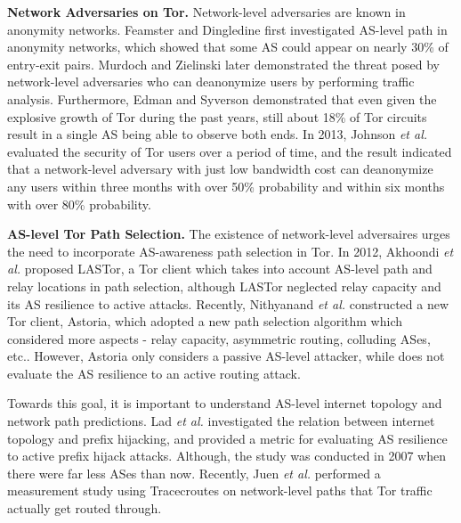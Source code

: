 {\bf Network Adversaries on Tor.}
Network-level adversaries are known in anonymity networks. Feamster and Dingledine \cite{feamster2004location} first investigated AS-level path in anonymity networks, which showed that some AS could appear on nearly 30\% of entry-exit pairs. Murdoch and Zielinski \cite{murdoch2007sampled} later demonstrated the threat posed by network-level adversaries who can deanonymize users by performing traffic analysis. Furthermore, Edman and Syverson \cite{edman2009awareness} demonstrated that even given the explosive growth of Tor during the past years, still about 18\% of Tor circuits result in a single AS being able to observe both ends. In 2013, Johnson \emph{et al.} \cite{johnson2013users} evaluated the security of Tor users over a period of time, and the result indicated that a network-level adversary with just low bandwidth cost can deanonymize any users within three months with over 50\% probability and within six months with over 80\% probability.

{\bf AS-level Tor Path Selection.}
The existence of network-level adversaires urges the need to incorporate AS-awareness path selection in Tor. In 2012, Akhoondi \emph{et al.} \cite{akhoondi2012lastor} proposed LASTor, a Tor client which takes into account AS-level path and relay locations in path selection, although LASTor neglected relay capacity and its AS resilience to active attacks. Recently, Nithyanand \emph{et al.} \cite{starov2015measuring} constructed a new Tor client, Astoria, which adopted a new path selection algorithm which considered more aspects - relay capacity, asymmetric routing, colluding ASes, etc.. However, Astoria only considers a passive AS-level attacker, while does not evaluate the AS resilience to an active routing attack.

Towards this goal, it is important to understand AS-level internet topology and network path predictions. Lad \emph{et al.} \cite{lad2007understanding} investigated the relation between internet topology and prefix hijacking, and provided a metric for evaluating AS resilience to active prefix hijack attacks. Although, the study was conducted in 2007 when there were far less ASes than now. Recently, Juen \emph{et al.} \cite{juen2014defending} performed a measurement study using Tracecroutes on network-level paths that Tor traffic actually get routed through. 

